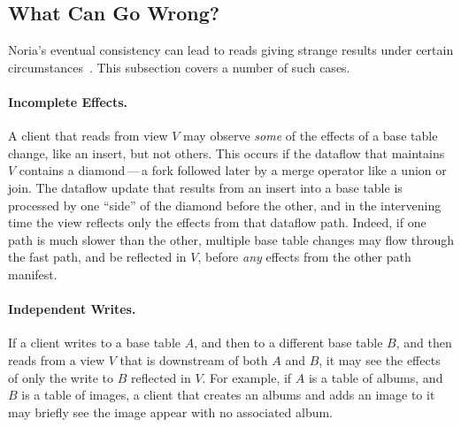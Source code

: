 \subsection{What Can Go Wrong?}

Noria's eventual consistency can lead to reads giving strange results under
certain circumstances~\cite{materialize-eventual}. This subsection covers a
number of such cases.


\paragraph{Incomplete Effects.}
A client that reads from view $V$ may observe \emph{some} of the effects of a
base table change, like an insert, but not others. This occurs if the dataflow
that maintains $V$ contains a diamond\,---\,a fork followed later by a merge
operator like a union or join. The dataflow update that results from an insert
into a base table is processed by one ``side'' of the diamond before the other,
and in the intervening time the view reflects only the effects from that
dataflow path. Indeed, if one path is much slower than the other, multiple base
table changes may flow through the fast path, and be reflected in $V$, before
\emph{any} effects from the other path manifest.

\paragraph{Independent Writes.}
If a client writes to a base table $A$, and then to a different base table $B$,
and then reads from a view $V$ that is downstream of both $A$ and $B$, it may
see the effects of only the write to $B$ reflected in $V$. For example, if $A$
is a table of albums, and $B$ is a table of images, a client that creates an
albums and adds an image to it may briefly see the image appear with no
associated album.

